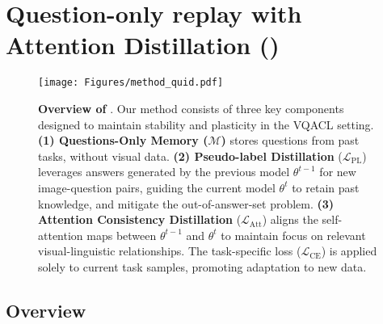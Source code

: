 \section{Question-only replay with Attention Distillation (\qstmethodshort{})}

\label{sec:method}


\begin{figure*}
    \centering
    \texttt{[image: Figures/method\_quid.pdf]}
    \vspace{-3mm}
    \caption{\textbf{Overview of \qstmethodshort{}}. 
    Our method consists of three key components designed to maintain stability and plasticity in the VQACL setting. 
    \textbf{(1) Questions-Only Memory (\(\mathcal{M}\))} stores questions from past tasks, without visual data. \textbf{(2) Pseudo-label Distillation} (\( \mathcal{L}_{\text{PL}} \)) leverages answers generated by the previous model \( \theta^{t-1} \) for new image-question pairs, guiding the current model \( \theta^{t} \) to retain past knowledge, and mitigate the out-of-answer-set problem. \textbf{(3) Attention Consistency Distillation} (\( \mathcal{L}_{\text{Att}} \)) aligns the self-attention maps between \( \theta^{t-1} \) and \( \theta^{t} \) to maintain focus on relevant visual-linguistic relationships. 
    The task-specific loss (\( \mathcal{L}_{\text{CE}} \)) is applied solely to current task samples, promoting adaptation to new data.}
    \vspace{-3mm}
    \label{fig:main_fig}
\end{figure*} 


\subsection{Overview}

